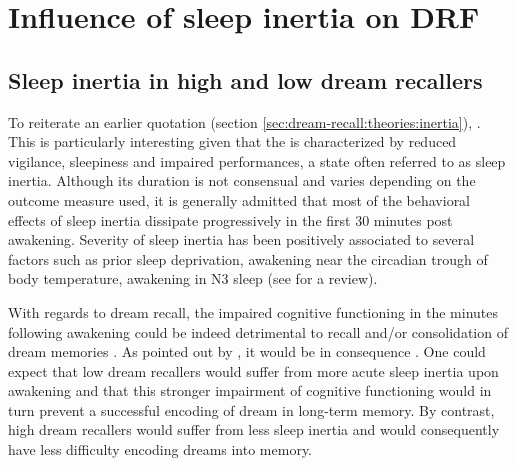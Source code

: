 \section{Influence of sleep inertia on DRF}
\label{sec:problematic:inertia}

\subsection{Sleep inertia in high and low dream recallers}
\label{sec:problematic:inertia:drf}

To reiterate an earlier quotation (section \ref{sec:dream-recall:theories:inertia}),  \citep{conduit_poor_2004}. This is particularly interesting given that the  is characterized by reduced vigilance, sleepiness and impaired performances, a state often referred to as sleep inertia. Although its duration is not consensual and varies depending on the outcome measure used, it is generally admitted that most of the behavioral effects of sleep inertia dissipate progressively in the first 30 minutes post awakening. Severity of sleep inertia has been positively associated to several factors such as prior sleep deprivation, awakening near the circadian trough of body temperature, awakening in N3 sleep (see \citealp{tassi_sleep_2000} for a review).

With regards to dream recall, the impaired cognitive functioning in the minutes following awakening could be indeed detrimental to recall and/or consolidation of dream memories \citep{conduit_poor_2004}. As pointed out by \citet{schredl_factors_2003}, it would be in consequence . One could expect that low dream recallers would suffer from more acute sleep inertia upon awakening and that this stronger impairment of cognitive functioning would in turn prevent a successful encoding of dream in long-term memory. By contrast, high dream recallers would suffer from less sleep inertia and would consequently have less difficulty encoding dreams into memory.

